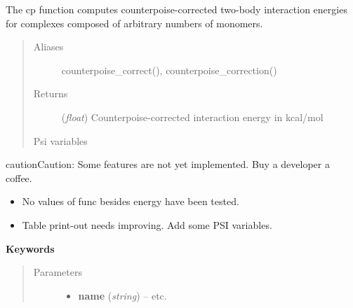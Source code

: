 \documentclass[letterpaper,10pt,english]{sphinxmanual}
\begin{document}
\begin{fulllineitems}
\label{index:wrappers.cp}
The cp function computes counterpoise-corrected two-body interaction energies
for complexes composed of arbitrary numbers of monomers.
\begin{quote}\begin{description}
\item[{Aliases }] \leavevmode
counterpoise\_correct(), counterpoise\_correction()

\item[{Returns}] \leavevmode
(\emph{float}) Counterpoise-corrected interaction energy in kcal/mol

\item[{Psi variables}] \leavevmode
\end{description}\end{quote}

\begin{fulllineitems}
\label{index:envvar-CP-CORRECTED2-BODYINTERACTIONENERGY}\label{index:envvar-UNCP-CORRECTED2-BODYINTERACTIONENERGY}
\end{fulllineitems}


\begin{notice}{caution}{Caution:}
Some features are not yet implemented. Buy a developer a coffee.
\begin{itemize}
\item {} 
No values of func besides energy have been tested.

\item {} 
Table print-out needs improving. Add some PSI variables.

\end{itemize}
\end{notice}

\textbf{Keywords}
\begin{quote}\begin{description}
\item[{Parameters}] \leavevmode\begin{itemize}
\item {} 
\textbf{name} (\emph{string}) -- 
 \textbar{}\textbar{}  \textbar{}\textbar{} etc.


\end{itemize}
\end{description}
\end{quote}
\end{fulllineitems}
\end{document}
